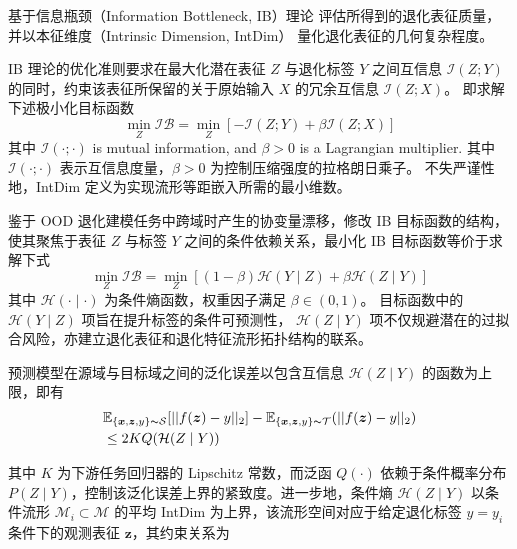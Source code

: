 基于信息瓶颈（Information Bottleneck, IB）理论 \cite{alemi2017deep} 评估所得到的退化表征质量，并以本征维度（Intrinsic Dimension, IntDim）\cite{10.5555/3692070.3694510} 量化退化表征的几何复杂程度。

IB 理论的优化准则要求在最大化潜在表征 $Z$ 与退化标签 $Y$ 之间互信息 $\mathcal{I}(Z;Y)$ 的同时，约束该表征所保留的关于原始输入 $X$ 的冗余互信息 $\mathcal{I}(Z;X)$。
即求解下述极小化目标函数
% 
\begin{equation}
    \min_{Z} \mathcal{IB} = \min_{Z} [- \mathcal{I}(Z;Y) + \beta \mathcal{I}(Z;X)]
    \label{IB_mutual_info}
\end{equation}
其中 $\mathcal{I}(\cdot;\cdot)$ is mutual information, and $\beta > 0$ is a Lagrangian multiplier. 
其中 $\mathcal{I}(\cdot;\cdot)$ 表示互信息度量，$\beta > 0$ 为控制压缩强度的拉格朗日乘子。
不失严谨性地，IntDim 定义为实现流形等距嵌入所需的最小维数。

鉴于 OOD 退化建模任务中跨域时产生的协变量漂移，修改 IB 目标函数的结构，使其聚焦于表征 $Z$ 与标签 $Y$ 之间的条件依赖关系，最小化 IB 目标函数等价于求解下式
% 
\begin{equation}
    \min_{Z} \mathcal{IB} = \min_{Z} [(1-\beta) \mathcal{H}(Y \mid Z) + \beta \mathcal{H}(Z \mid Y)]
    \label{IB_cond_entropy}
\end{equation}
% 
其中 $\mathcal{H}(\cdot \mid \cdot)$ 为条件熵函数，权重因子满足 $\beta \in (0,1)$。
目标函数中的 $\mathcal{H}(Y \mid Z)$ 项旨在提升标签的条件可预测性， $\mathcal{H}(Z \mid Y)$ 项不仅规避潜在的过拟合风险，亦建立退化表征和退化特征流形拓扑结构的联系。

预测模型在源域与目标域之间的泛化误差以包含互信息 $\mathcal{H}(Z \mid Y)$ 的函数为上限，即有
% 
\begin{align}
    & \mathbb{E}_{\{\boldsymbol{x},\boldsymbol{z},y\}\thicksim \mathcal{S}}[||f(\boldsymbol{z})-{y}||_2] -\mathbb{E}_{\{\boldsymbol{x},\boldsymbol{z},y\}\thicksim \mathcal{T}}(||f(\boldsymbol{z})-{y}||_2) \notag \\
    & \leq 2KQ(\mathcal{H}(Z \mid Y)) \label{generalization_error}
\end{align}

其中 $K$ 为下游任务回归器的 Lipschitz 常数，而泛函 $Q(\cdot)$ 依赖于条件概率分布 $P(Z \mid Y)$，控制该泛化误差上界的紧致度。进一步地，条件熵 $\mathcal{H}(Z \mid Y)$ 以条件流形 $\mathcal{M}_i \subset \mathcal{M}$ 的平均 IntDim 为上界，该流形空间对应于给定退化标签 $y = y_i$ 条件下的观测表征 $\boldsymbol{z}$，其约束关系为

